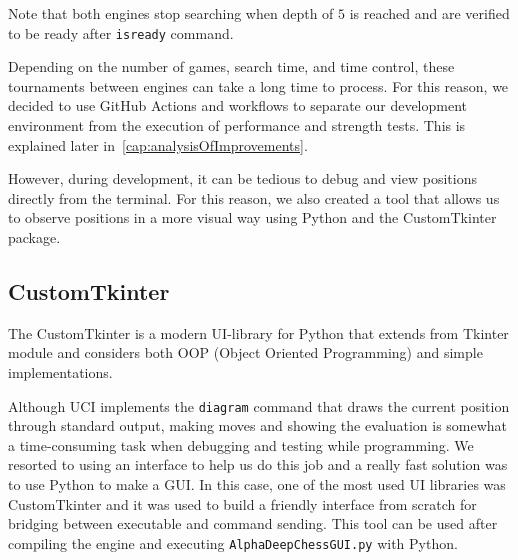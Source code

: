 \vspace{1em}

\noindent Note that both engines stop searching when depth of $5$ is reached and are verified to be ready after \texttt{isready} command.

\vspace{1em}

\noindent Depending on the number of games, search time, and time control, these tournaments between engines can take a long time to process. For this reason, we decided to use GitHub Actions and workflows to separate our development environment from the execution of performance and strength tests. This is explained later in~\cref{cap:analysisOfImprovements}.

\vspace{1em}

\noindent However, during development, it can be tedious to debug and view positions directly from the terminal. For this reason, we also created a tool that allows us to observe positions in a more visual way using Python and the CustomTkinter package.

\subsection{CustomTkinter}

The CustomTkinter is a modern UI-library for Python that extends from Tkinter module and considers both OOP (Object Oriented Programming) and simple implementations.

\vspace{1em}

\noindent Although UCI implements the \texttt{diagram} command that draws the current position through standard output, making moves and showing the evaluation is somewhat a time-consuming task when debugging and testing while programming. We resorted to using an interface to help us do this job and a really fast solution was to use Python to make a GUI. In this case, one of the most used UI libraries was CustomTkinter and it was used to build a friendly interface from scratch for bridging between executable and command sending. This tool can be used after compiling the engine and executing \texttt{AlphaDeepChessGUI.py} with Python.

